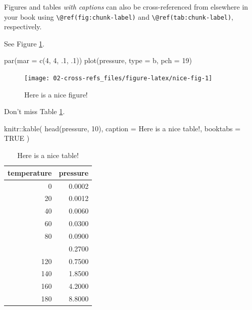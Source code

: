 \documentclass[
]{book}
\newenvironment{Shaded}{\begin{snugshade}}{\end{snugshade}}
\newcommand{\AttributeTok}[1]{\textcolor[rgb]{0.77,0.63,0.00}{#1}}
\newcommand{\ConstantTok}[1]{\textcolor[rgb]{0.00,0.00,0.00}{#1}}
\newcommand{\DecValTok}[1]{\textcolor[rgb]{0.00,0.00,0.81}{#1}}
\newcommand{\FunctionTok}[1]{\textcolor[rgb]{0.00,0.00,0.00}{#1}}
\newcommand{\NormalTok}[1]{#1}
\newcommand{\SpecialCharTok}[1]{\textcolor[rgb]{0.00,0.00,0.00}{#1}}
\newcommand{\StringTok}[1]{\textcolor[rgb]{0.31,0.60,0.02}{#1}}
\theoremstyle{definition}
\theoremstyle{definition}
\theoremstyle{definition}
\theoremstyle{definition}
\theoremstyle{remark}
\begin{document}
Figures and tables \emph{with captions} can also be cross-referenced from elsewhere in your book using \texttt{\textbackslash{}@ref(fig:chunk-label)} and \texttt{\textbackslash{}@ref(tab:chunk-label)}, respectively.

See Figure \ref{fig:nice-fig}.

\begin{Shaded}
\begin{Highlighting}[]
\FunctionTok{par}\NormalTok{(}\AttributeTok{mar =} \FunctionTok{c}\NormalTok{(}\DecValTok{4}\NormalTok{, }\DecValTok{4}\NormalTok{, .}\DecValTok{1}\NormalTok{, .}\DecValTok{1}\NormalTok{))}
\FunctionTok{plot}\NormalTok{(pressure, }\AttributeTok{type =} \StringTok{\textquotesingle{}b\textquotesingle{}}\NormalTok{, }\AttributeTok{pch =} \DecValTok{19}\NormalTok{)}
\end{Highlighting}
\end{Shaded}

\begin{figure}

{\centering \texttt{[image: 02-cross-refs\_files/figure-latex/nice-fig-1]} 

}

\caption{Here is a nice figure!}\label{fig:nice-fig}
\end{figure}

Don't miss Table \ref{tab:nice-tab}.

\begin{Shaded}
\begin{Highlighting}[]
\NormalTok{knitr}\SpecialCharTok{::}\FunctionTok{kable}\NormalTok{(}
  \FunctionTok{head}\NormalTok{(pressure, }\DecValTok{10}\NormalTok{), }\AttributeTok{caption =} \StringTok{\textquotesingle{}Here is a nice table!\textquotesingle{}}\NormalTok{,}
  \AttributeTok{booktabs =} \ConstantTok{TRUE}
\NormalTok{)}
\end{Highlighting}
\end{Shaded}

\begin{table}

\caption{\label{tab:nice-tab}Here is a nice table!}
\centering
\begin{tabular}[t]{rr}
\toprule
temperature & pressure\\
\midrule
0 & 0.0002\\
20 & 0.0012\\
40 & 0.0060\\
60 & 0.0300\\
80 & 0.0900\\
\addlinespace
100 & 0.2700\\
120 & 0.7500\\
140 & 1.8500\\
160 & 4.2000\\
180 & 8.8000\\
\bottomrule
\end{tabular}
\end{table}
\end{document}
